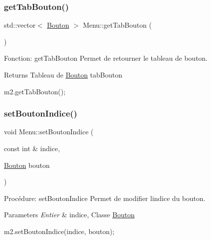\subsubsection{\texorpdfstring{get\+Tab\+Bouton()}{getTabBouton()}}
{\footnotesize\ttfamily std\+::vector$<$ \hyperlink{classBouton}{Bouton} $>$ Menu\+::get\+Tab\+Bouton (\begin{DoxyParamCaption}{ }\end{DoxyParamCaption})}



Fonction\+: get\+Tab\+Bouton Permet de retourner le tableau de bouton. 

\begin{DoxyReturn}{Returns}
Tableau de \hyperlink{classBouton}{Bouton} tab\+Bouton 
\begin{DoxyCode}
m2.getTabBouton();
\end{DoxyCode}
 
\end{DoxyReturn}
\mbox{\label{classMenu_acedbb44af6fcc981aef033a585df2169}} 
\subsubsection{\texorpdfstring{set\+Bouton\+Indice()}{setBoutonIndice()}}
{\footnotesize\ttfamily void Menu\+::set\+Bouton\+Indice (\begin{DoxyParamCaption}\item[{const int \&}]{indice,  }\item[{\hyperlink{classBouton}{Bouton}}]{bouton }\end{DoxyParamCaption})}



Procédure\+: set\+Bouton\+Indice Permet de modifier l\textquotesingle{}indice du bouton\textquotesingle{}. 


\begin{DoxyParams}{Parameters}
{\em Entier} & indice, Classe \hyperlink{classBouton}{Bouton} 
\begin{DoxyCode}
m2.setBoutonIndice(indice, bouton);
\end{DoxyCode}
 \\
\hline
\end{DoxyParams}
\mbox{\label{classMenu_a45b3fe1a4d7cca82acabd3102d8bfd7c}} 
